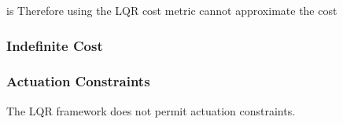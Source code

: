 \documentclass[letterpaper, 10pt, english, conference]{IEEEtran}
\begin{document}
is Therefore using the LQR cost metric cannot approximate the cost

\subsubsection{Indefinite Cost}

\subsubsection{Actuation Constraints}

The LQR framework does not permit actuation constraints.

\end{document}
